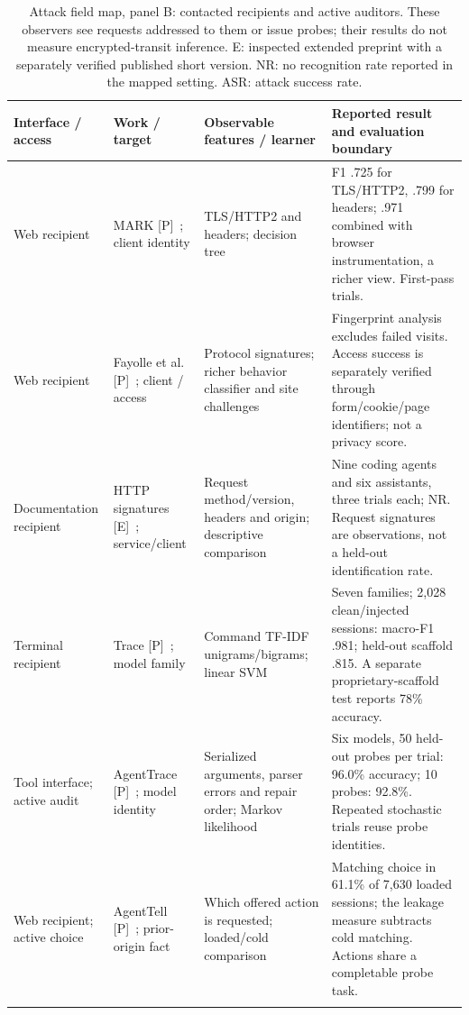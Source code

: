 \begin{table}[t]\centering\small
\caption{Attack field map, panel B: contacted recipients and active auditors. These observers see requests addressed to them or issue probes; their results do not measure encrypted-transit inference. E: inspected extended preprint with a separately verified published short version. NR: no recognition rate reported in the mapped setting. ASR: attack success rate.}
\label{tab:attack-recipient}
\setlength{\tabcolsep}{4pt}
\begin{tabularx}{\textwidth}{@{}P{.13\textwidth}P{.18\textwidth}P{.23\textwidth}Y@{}}\toprule
Interface / access & Work / target & Observable features / learner & Reported result and evaluation boundary \\\midrule
Web recipient & MARK [P]~\cite{kang2026whoseagent}; client identity & TLS/HTTP2 and headers; decision tree & F1 .725 for TLS/HTTP2, .799 for headers; .971 combined with browser instrumentation, a richer view. First-pass trials. \\\addlinespace[3pt]
Web recipient & Fayolle et al. [P]~\cite{fayolle2026webagents}; client / access & Protocol signatures; richer behavior classifier and site challenges & Fingerprint analysis excludes failed visits. Access success is separately verified through form/cookie/page identifiers; not a privacy score. \\\addlinespace[3pt]
Documentation recipient & HTTP signatures [E]~\cite{borysenko2026http}; service/client & Request method/version, headers and origin; descriptive comparison & Nine coding agents and six assistants, three trials each; NR. Request signatures are observations, not a held-out identification rate. \\\addlinespace[3pt]
Terminal recipient & Trace [P]~\cite{ediga2026trace}; model family & Command TF-IDF unigrams/bigrams; linear SVM & Seven families; 2,028 clean/injected sessions: macro-F1 .981; held-out scaffold .815. A separate proprietary-scaffold test reports 78\% accuracy. \\\addlinespace[3pt]
Tool interface; active audit & AgentTrace [P]~\cite{zhao2026agenttrace}; model identity & Serialized arguments, parser errors and repair order; Markov likelihood & Six models, 50 held-out probes per trial: 96.0\% accuracy; 10 probes: 92.8\%. Repeated stochastic trials reuse probe identities. \\\addlinespace[3pt]
Web recipient; active choice & AgentTell [P]~\cite{shahriar2026agenttell}; prior-origin fact & Which offered action is requested; loaded/cold comparison & Matching choice in 61.1\% of 7,630 loaded sessions; the leakage measure subtracts cold matching. Actions share a completable probe task. \\\addlinespace[3pt]

\end{tabularx}
\end{table}
